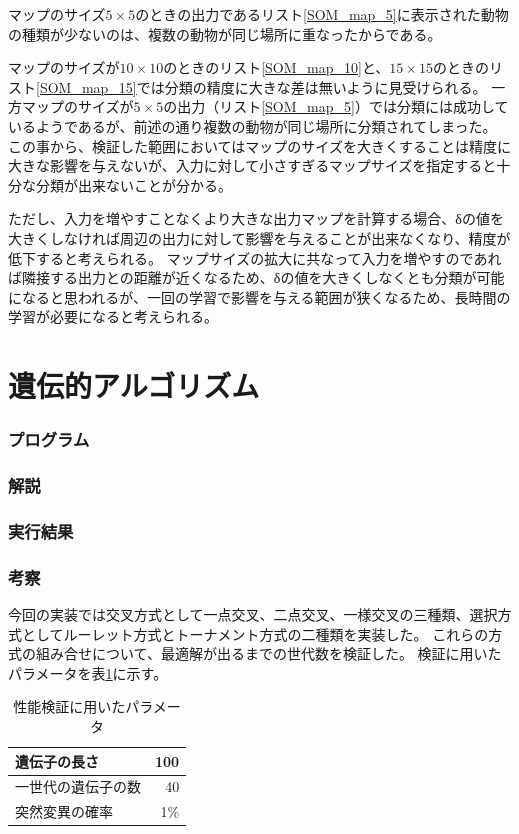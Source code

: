 \documentclass{jsarticle}
\begin{document}
マップのサイズ$5\times5$のときの出力であるリスト\ref{SOM_map_5}に表示された動物の種類が少ないのは、複数の動物が同じ場所に重なったからである。

マップのサイズが$10\times10$のときのリスト\ref{SOM_map_10}と、$15\times15$のときのリスト\ref{SOM_map_15}では分類の精度に大きな差は無いように見受けられる。
一方マップのサイズが$5\times5$の出力（リスト\ref{SOM_map_5}）では分類には成功しているようであるが、前述の通り複数の動物が同じ場所に分類されてしまった。
この事から、検証した範囲においてはマップのサイズを大きくすることは精度に大きな影響を与えないが、入力に対して小さすぎるマップサイズを指定すると十分な分類が出来ないことが分かる。

ただし、入力を増やすことなくより大きな出力マップを計算する場合、δの値を大きくしなければ周辺の出力に対して影響を与えることが出来なくなり、精度が低下すると考えられる。
マップサイズの拡大に共なって入力を増やすのであれば隣接する出力との距離が近くなるため、δの値を大きくしなくとも分類が可能になると思われるが、一回の学習で影響を与える範囲が狭くなるため、長時間の学習が必要になると考えられる。


\part{遺伝的アルゴリズム}
\section{プログラム}


\section{解説}


\section{実行結果}


\section{考察}
今回の実装では交叉方式として一点交叉、二点交叉、一様交叉の三種類、選択方式としてルーレット方式とトーナメント方式の二種類を実装した。
これらの方式の組み合せについて、最適解が出るまでの世代数を検証した。
検証に用いたパラメータを表\ref{GA_params}に示す。

\begin{table}[H]
	\caption{性能検証に用いたパラメータ\label{GA_params}}
	\begin{center}
		\begin{tabular}{|l|r|} \hline
			遺伝子の長さ & 100 \\ \hline
			一世代の遺伝子の数 & 40 \\ \hline
			突然変異の確率 & 1\% \\ \hline
		\end{tabular}
	\end{center}
\end{table}
\end{document}
